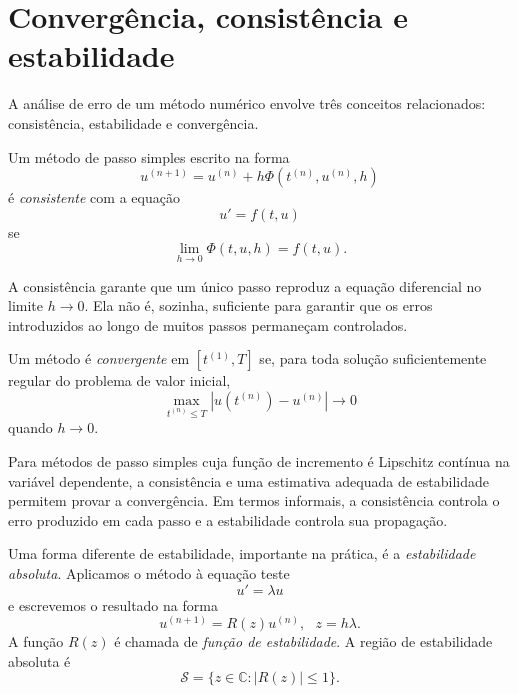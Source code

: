 \section{Convergência, consistência e estabilidade}

A análise de erro de um método numérico envolve três conceitos relacionados: consistência, estabilidade e convergência.

\begin{defn}
Um método de passo simples escrito na forma
\begin{equation}
u^{(n+1)}=u^{(n)}+h\Phi(t^{(n)},u^{(n)},h)
\end{equation}
é \emph{consistente} com a equação
\begin{equation}
u'=f(t,u)
\end{equation}
se
\begin{equation}
\lim_{h\to0}\Phi(t,u,h)=f(t,u).
\end{equation}
\end{defn}

A consistência garante que um único passo reproduz a equação diferencial no limite $h\to0$. Ela não é, sozinha, suficiente para garantir que os erros introduzidos ao longo de muitos passos permaneçam controlados.

\begin{defn}
Um método é \emph{convergente} em $[t^{(1)},T]$ se, para toda solução suficientemente regular do problema de valor inicial,
\begin{equation}
\max_{t^{(n)}\leq T}|u(t^{(n)})-u^{(n)}|\longrightarrow0
\end{equation}
quando $h\to0$.
\end{defn}

Para métodos de passo simples cuja função de incremento é Lipschitz contínua na variável dependente, a consistência e uma estimativa adequada de estabilidade permitem provar a convergência. Em termos informais, a consistência controla o erro produzido em cada passo e a estabilidade controla sua propagação.

Uma forma diferente de estabilidade, importante na prática, é a \emph{estabilidade absoluta}. Aplicamos o método à equação teste
\begin{equation}
u'=\lambda u
\end{equation}
e escrevemos o resultado na forma
\begin{equation}
u^{(n+1)}=R(z)u^{(n)},~~~z=h\lambda.
\end{equation}
A função $R(z)$ é chamada de \emph{função de estabilidade}. A região de estabilidade absoluta é
\begin{equation}
\mathcal{S}=\{z\in\mathbb{C}:|R(z)|\leq1\}.
\end{equation}

